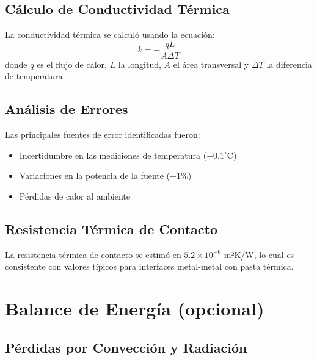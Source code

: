 \documentclass[9pt,a4paper,twocolumn,twoside]{lab-class/lab}
\begin{document}
    \subsection{Cálculo de Conductividad Térmica}

        La conductividad térmica se calculó usando la ecuación:
        \begin{equation}
            k = -\frac{q L}{A \Delta T}
        \end{equation}
        donde $q$ es el flujo de calor, $L$ la longitud, $A$ el área transversal y $\Delta T$ la diferencia de temperatura.

    \subsection{Análisis de Errores}

        Las principales fuentes de error identificadas fueron:
        \begin{itemize}
            \item Incertidumbre en las mediciones de temperatura ($\pm 0.1^{\circ}$C)
            \item Variaciones en la potencia de la fuente ($\pm 1\%$)
            \item Pérdidas de calor al ambiente
        \end{itemize}

    \subsection{Resistencia Térmica de Contacto}

        La resistencia térmica de contacto se estimó en $5.2 \times 10^{-6}$ m²K/W, lo cual es consistente con valores típicos para interfaces metal-metal con pasta térmica.

\section{Balance de Energía (opcional)}
    \subsection{Pérdidas por Convección y Radiación}
\end{document}
